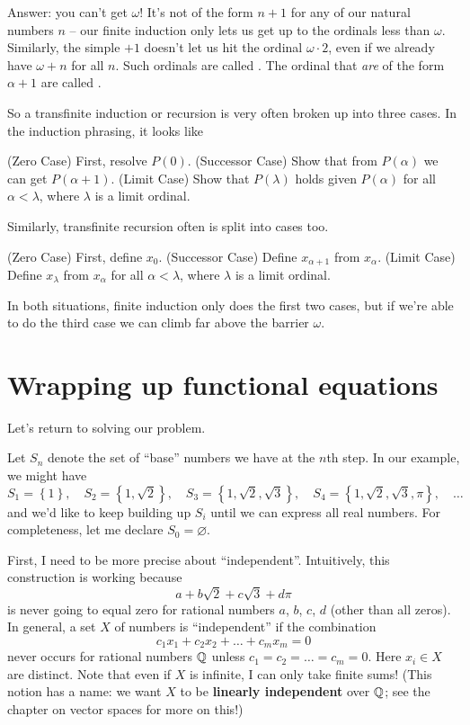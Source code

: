 Answer: you can't get $\omega$!
It's not of the form $n+1$ for any of our natural numbers $n$ -- our finite induction only lets us
get up to the ordinals less than $\omega$.
Similarly, the simple $+1$ doesn't let us hit the ordinal $\omega \cdot 2$,
even if we already have $\omega+n$ for all $n$.
Such ordinals are called .
The ordinal that \emph{are} of the form $\alpha+1$ are called .

So a transfinite induction or recursion is very often broken up into three cases.
In the induction phrasing, it looks like
\begin{itemize}
	\ii (Zero Case) First, resolve $P(0)$.
	\ii (Successor Case) Show that from $P(\alpha)$ we can get $P(\alpha+1)$.
	\ii (Limit Case) Show that $P(\lambda)$ holds given $P(\alpha)$ for all $\alpha < \lambda$,
	where $\lambda$ is a limit ordinal.
\end{itemize}
Similarly, transfinite recursion often is split into cases too.
\begin{itemize}
	\ii (Zero Case) First, define $x_0$.
	\ii (Successor Case) Define $x_{\alpha+1}$ from $x_\alpha$.
	\ii (Limit Case) Define $x_\lambda$ from $x_\alpha$ for all $\alpha < \lambda$,
	where $\lambda$ is a limit ordinal.
\end{itemize}
In both situations, finite induction only does the first two cases,
but if we're able to do the third case we can climb far above the barrier $\omega$.

\section{Wrapping up functional equations}
Let's return to solving our problem.

Let $S_n$ denote the set of ``base'' numbers we have at the $n$th step.
In our example, we might have
\[
	S_1 = \left\{ 1 \right\}, \quad
	S_2 = \left\{ 1, \sqrt 2 \right\}, \quad
	S_3 = \left\{ 1, \sqrt 2, \sqrt 3 \right\}, \quad
	S_4 = \left\{ 1, \sqrt 2, \sqrt 3, \pi \right\}, \quad
	\dots
\]
and we'd like to keep building up $S_i$ until we can express all real numbers.
For completeness, let me declare $S_0 = \varnothing$.

First, I need to be more precise about ``independent''.
Intuitively, this construction is working because
\[ a + b \sqrt 2 + c \sqrt 3 + d \pi \]
is never going to equal zero for rational numbers $a$, $b$, $c$, $d$ (other than all zeros).
In general, a set $X$ of numbers is ``independent'' if the combination
\[ c_1 x_1 + c_2 x_2 + \dots + c_m x_m = 0 \]
never occurs for rational numbers $\mathbb Q$ unless $c_1 = c_2 = \dots = c_m = 0$.
Here $x_i \in X$ are distinct. Note that even if $X$ is infinite,
I can only take finite sums!
(This notion has a name: we want $X$ to be \textbf{linearly independent} over $\mathbb Q$;
see the chapter on vector spaces for more on this!)

